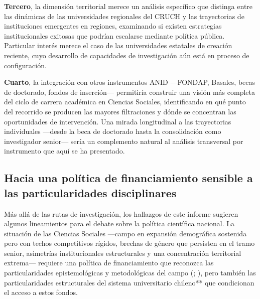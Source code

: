 \documentclass[
  spanish,
  a4paper,
  oneside]{scrbook}
\begin{document}
\textbf{Tercero}, la dimensión territorial merece un análisis específico
que distinga entre las dinámicas de las universidades regionales del
CRUCH y las trayectorias de instituciones emergentes en regiones,
examinando si existen estrategias institucionales exitosas que podrían
escalarse mediante política pública. Particular interés merece el caso
de las universidades estatales de creación reciente, cuyo desarrollo de
capacidades de investigación aún está en proceso de configuración.

\textbf{Cuarto}, la integración con otros instrumentos ANID ---FONDAP,
Basales, becas de doctorado, fondos de inserción--- permitiría construir
una visión más completa del ciclo de carrera académica en Ciencias
Sociales, identificando en qué punto del recorrido se producen las
mayores filtraciones y dónde se concentran las oportunidades de
intervención. Una mirada longitudinal a las trayectorias individuales
---desde la beca de doctorado hasta la consolidación como investigador
senior--- sería un complemento natural al análisis transversal por
instrumento que aquí se ha presentado.

\subsection{Hacia una política de financiamiento sensible a las
particularidades
disciplinares}\label{hacia-una-poluxedtica-de-financiamiento-sensible-a-las-particularidades-disciplinares}

Más allá de las rutas de investigación, los hallazgos de este informe
sugieren algunos lineamientos para el debate sobre la política
científica nacional. La situación de las Ciencias Sociales ---campo en
expansión demográfica sostenida pero con techos competitivos rígidos,
brechas de género que persisten en el tramo senior, asimetrías
institucionales estructurales y una concentración territorial extrema---
requiere una política de financiamiento que reconozca las
particularidades epistemológicas y metodológicas del campo
(;
),
pero también las particularidades estructurales del sistema
universitario chileno** que condicionan el acceso a estos fondos.
\end{document}
